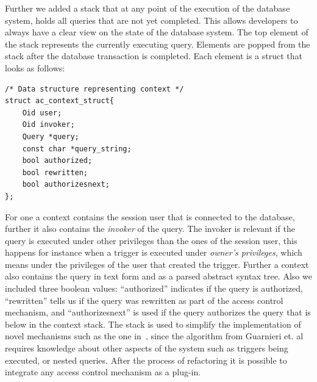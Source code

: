 Further we added a stack that at any point of the execution of the database system, holds all queries that are not yet completed.
%
This allows developers to always have a clear view on the state of the database system.
%
The top element of the stack represents the currently executing query.
%
Elements are popped from the stack after the database transaction is completed.
%
Each element is a struct that looks as follows:
%
\begin{lstlisting}[frame=single, style=customc]
/* Data structure representing context */
struct ac_context_struct{
	Oid user;
	Oid invoker;
	Query *query;
	const char *query_string;
	bool authorized;
	bool rewritten;
	bool authorizesnext;
};
\end{lstlisting}
%
For one a context contains the session user that is connected to the database, further it also contains the \emph{invoker} of the query.
%
The invoker is relevant if the query is executed under other privileges than the ones of the session user, this happens for instance when a trigger is executed under \emph{owner's privileges}, which means under the privileges of the user that created the trigger.
%
Further a context also contains the query in text form and as a parsed abstract syntax tree.
%
Also we included three boolean values: ``authorized'' indicates if the query is authorized, ``rewritten'' tells us if the query was rewritten as part of the access control mechanism, and ``authorizesnext'' is used if the query authorizes the query that is below in the context stack.
%
The stack is used to simplify the implementation of novel mechanisms such as the one in~\cite{guarnieri2016strong}, since the algorithm from Guarnieri et. al requires knowledge about other aspects of the system such as triggers being executed, or nested queries.
%
After the process of refactoring it is possible to integrate any access control mechanism as a plug-in.